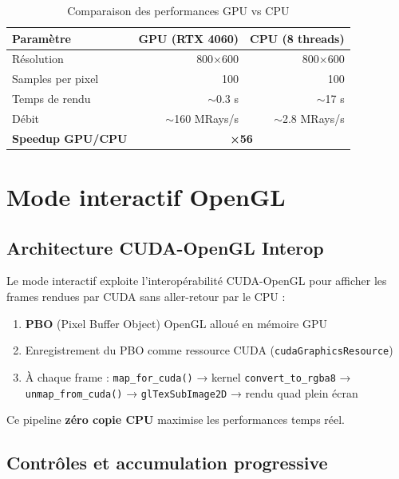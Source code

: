 \documentclass[12pt,a4paper]{article}
\begin{document}
\begin{table}[H]
\centering
\begin{tabular}{lrr}
\toprule
\textbf{Paramètre} & \textbf{GPU (RTX 4060)} & \textbf{CPU (8 threads)} \\
\midrule
Résolution          & 800×600     & 800×600 \\
Samples per pixel   & 100         & 100 \\
Temps de rendu      & $\sim$0.3 s & $\sim$17 s \\
Débit               & $\sim$160 MRays/s & $\sim$2.8 MRays/s \\
\textbf{Speedup GPU/CPU} & \multicolumn{2}{c}{\textbf{×56}} \\
\bottomrule
\end{tabular}
\caption{Comparaison des performances GPU vs CPU}
\end{table}

\section{Mode interactif OpenGL}

\subsection{Architecture CUDA-OpenGL Interop}

Le mode interactif exploite l'interopérabilité CUDA-OpenGL pour afficher
les frames rendues par CUDA sans aller-retour par le CPU :

\begin{enumerate}
    \item \textbf{PBO} (Pixel Buffer Object) OpenGL alloué en mémoire GPU
    \item Enregistrement du PBO comme ressource CUDA (\texttt{cudaGraphicsResource})
    \item À chaque frame : \texttt{map\_for\_cuda()} → kernel \texttt{convert\_to\_rgba8} →
    \texttt{unmap\_from\_cuda()} → \texttt{glTexSubImage2D} → rendu quad plein écran
\end{enumerate}

Ce pipeline \textbf{zéro copie CPU} maximise les performances temps réel.

\subsection{Contrôles et accumulation progressive}
\end{document}
